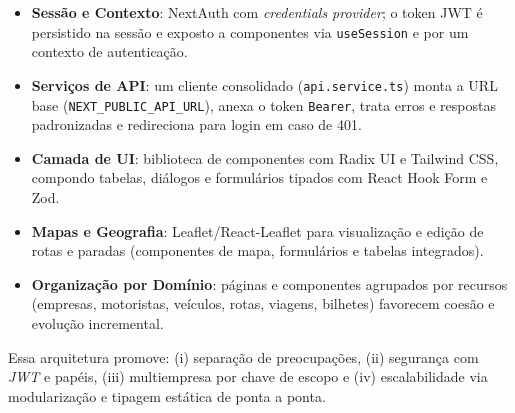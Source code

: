 \begin{itemize}
  \item \textbf{Sessão e Contexto}: NextAuth com \textit{credentials provider}; o token JWT é persistido na sessão e exposto a componentes via \texttt{useSession} e por um contexto de autenticação.
  \item \textbf{Serviços de API}: um cliente consolidado (\texttt{api.service.ts}) monta a URL base (\texttt{NEXT\_PUBLIC\_API\_URL}), anexa o token \texttt{Bearer}, trata erros e respostas padronizadas e redireciona para login em caso de 401.
  \item \textbf{Camada de UI}: biblioteca de componentes com Radix UI e Tailwind CSS, compondo tabelas, diálogos e formulários tipados com React Hook Form e Zod.
  \item \textbf{Mapas e Geografia}: Leaflet/React-Leaflet para visualização e edição de rotas e paradas (componentes de mapa, formulários e tabelas integrados).
  \item \textbf{Organização por Domínio}: páginas e componentes agrupados por recursos (empresas, motoristas, veículos, rotas, viagens, bilhetes) favorecem coesão e evolução incremental.
\end{itemize}

Essa arquitetura promove: (i) separação de preocupações, (ii) segurança com \textit{JWT} e papéis, (iii) multiempresa por chave de escopo e (iv) escalabilidade via modularização e tipagem estática de ponta a ponta.
